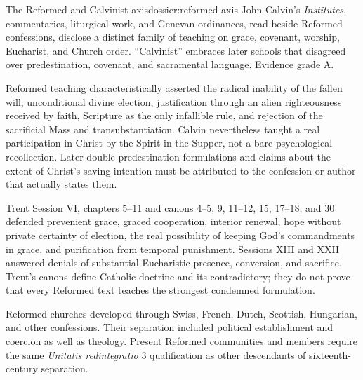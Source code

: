 \begin{heresydossier}{The Reformed and Calvinist axis}{dossier:reformed-axis}
\objectfield John Calvin's \emph{Institutes}, commentaries, liturgical work, and Genevan ordinances, read beside Reformed confessions, disclose a distinct family of teaching on grace, covenant, worship, Eucharist, and Church order. ``Calvinist'' embraces later schools that disagreed over predestination, covenant, and sacramental language. Evidence grade A.

\propositionfield Reformed teaching characteristically asserted the radical inability of the fallen will, unconditional divine election, justification through an alien righteousness received by faith, Scripture as the only infallible rule, and rejection of the sacrificial Mass and transubstantiation. Calvin nevertheless taught a real participation in Christ by the Spirit in the Supper, not a bare psychological recollection. Later double-predestination formulations and claims about the extent of Christ's saving intention must be attributed to the confession or author that actually states them.

\responsefield Trent Session VI, chapters 5--11 and canons 4--5, 9, 11--12, 15, 17--18, and 30 defended prevenient grace, graced cooperation, interior renewal, hope without private certainty of election, the real possibility of keeping God's commandments in grace, and purification from temporal punishment. Sessions XIII and XXII answered denials of substantial Eucharistic presence, conversion, and sacrifice. Trent's canons define Catholic doctrine and its contradictory; they do not prove that every Reformed text teaches the strongest condemned formulation.

\aftermathfield Reformed churches developed through Swiss, French, Dutch, Scottish, Hungarian, and other confessions. Their separation included political establishment and coercion as well as theology. Present Reformed communities and members require the same \emph{Unitatis redintegratio} 3 qualification as other descendants of sixteenth-century separation.
\end{heresydossier}

